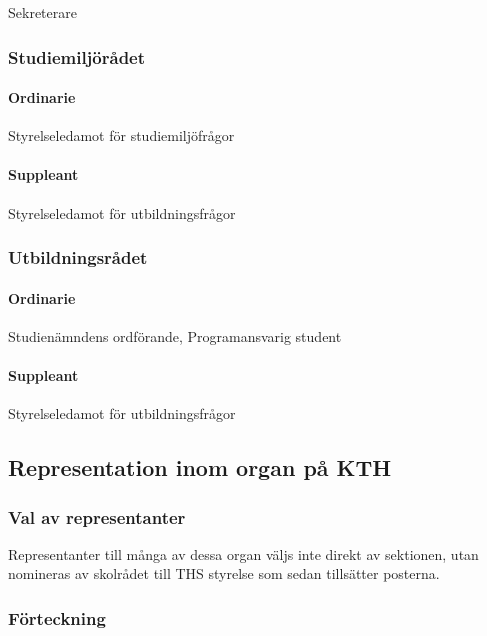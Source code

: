\documentclass{dgovdoc}
\begin{document}
Sekreterare

\subsubsection{Studiemiljörådet}

\paragraph{Ordinarie}

Styrelseledamot för studiemiljöfrågor

\paragraph{Suppleant}

Styrelseledamot för utbildningsfrågor

\subsubsection{Utbildningsrådet}

\paragraph{Ordinarie}

Studienämndens ordförande, Programansvarig student

\paragraph{Suppleant}

Styrelseledamot för utbildningsfrågor

\subsection{Representation inom organ på KTH}

\subsubsection{Val av representanter}

Representanter till många av dessa organ väljs inte direkt av sektionen, utan
nomineras av skolrådet till THS styrelse som sedan tillsätter posterna.

\subsubsection{Förteckning}
\end{document}
